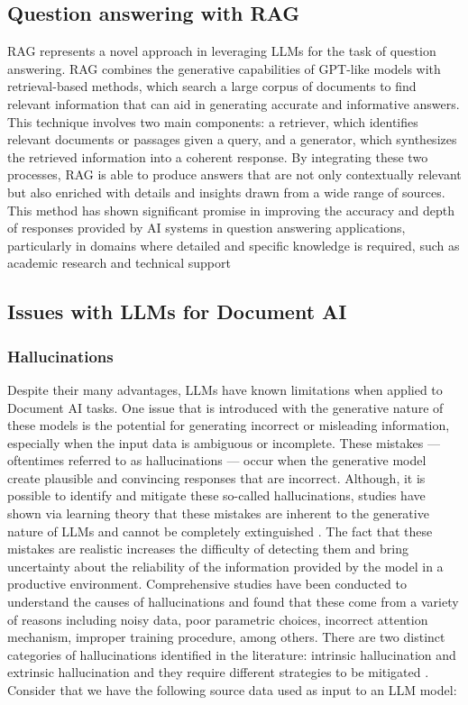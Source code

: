 \documentclass[english, 12pt, a4paper, elec, utf8, a-2b, online]{aaltothesis}
\begin{document}
\subsection{Question answering with RAG}

\ac{RAG} represents a novel approach in leveraging \ac{LLM}s for the task of question answering.
\ac{RAG} combines the generative capabilities of GPT-like models with retrieval-based methods, which search a large corpus of documents to find relevant information that can aid in generating accurate and informative answers.
This technique involves two main components: a retriever, which identifies relevant documents or passages given a query, and a generator, which synthesizes the retrieved information into a coherent response.
By integrating these two processes, RAG is able to produce answers that are not only contextually relevant but also enriched with details and insights drawn from a wide range of sources.
This method has shown significant promise in improving the accuracy and depth of responses provided by AI systems in question answering applications, particularly in domains where detailed and specific knowledge is required, such as academic research and technical support %

\subsection{Issues with LLMs for Document AI}

\subsubsection{Hallucinations}

Despite their many advantages, \ac{LLM}s have known limitations when applied to Document AI tasks.
One issue that is introduced with the generative nature of these models is the potential for generating incorrect or misleading information, especially when the input data is ambiguous or incomplete.
These mistakes --- oftentimes referred to as hallucinations --- occur when the generative model create plausible and convincing responses that are incorrect.
Although, it is possible to identify and mitigate these so-called hallucinations, studies have shown via learning theory that these mistakes are inherent to the generative nature of \ac{LLM}s and cannot be completely extinguished \cite{xu2024hallucination}.
The fact that these mistakes are realistic increases the difficulty of detecting them and bring uncertainty about the reliability of the information provided by the model in a productive environment.
Comprehensive studies have been conducted to understand the causes of hallucinations and found that these come from a variety of reasons including noisy data, poor
parametric choices, incorrect attention mechanism, improper training procedure, among others.
There are two distinct categories of hallucinations identified in the literature: intrinsic hallucination and extrinsic hallucination and they require different strategies to be mitigated \cite{survey_hallucination_natural_language_generation}.
Consider that we have the following source data used as input to an \ac{LLM} model:
\end{document}
